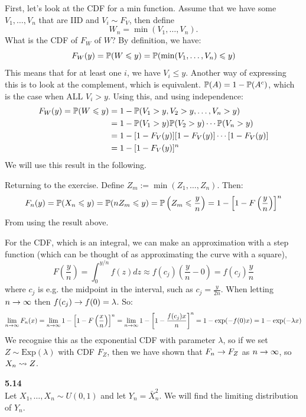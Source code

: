 \medskip\noindent First, let's look at the CDF for a min function. Assume that
we have some $V_1, \ldots, V_n$ that are IID and $V_i\sim F_V$, then define
$$
W_n = \min(V_1,\ldots, V_n).
$$
What is the CDF of $F_W$ of $W$? By definition, we have:
$$
F_W(y) = \P(W\leq y) = \P(\min(V_1,\ldots,V_n) \leq y)
$$
This means that for at least one $i$, we have $V_i\leq y$. Another way of expressing
this is to look at the complement, which is equivalent. $\P(A) = 1 - \P(A^c)$, which
is the case when ALL $V_i > y$. Using this, and using independence:
\begin{align*}
    F_W(y) = \P(W\leq y)
    &= 1 - \P(V_1 > y, V_2 > y, \ldots, V_n > y) \\
    &= 1 - \P(V_1 > y)\P(V_2 > y)\cdots\P(V_n > y) \\
    &= 1 - [1 - F_V(y)][1 - F_V(y)]\cdots[1 - F_V(y)] \\
    &= 1 - [1 - F_V(y)]^n
\end{align*}
We will use this result in the following.

\medskip\noindent Returning to the exercise. Define $Z_m := \min(Z_1,\ldots, Z_n)$. Then:
\begin{align*}
    F_n(y) = \P(X_n \leq y) = \P(nZ_m \leq y) = \P\left(Z_m \leq \frac{y}{n}\right) 
    = 1 - \left[1 - F\left(\frac{y}{n}\right)\right]^n %
\end{align*}
From using the result above.

For the CDF, which is an integral, we can make an approximation with a step function
(which can be thought of as approximating the curve with a square),
$$
F\left(\frac{y}{n}\right) = \int_0^{y/n} f(z)dz \approx f(c_j)\left(\frac{y}{n} - 0\right)
= f(c_j)\frac{y}{n}
$$
where $c_j$ is e.g. the midpoint in the interval, such as $c_j = \frac{y}{2n}$.
When letting $n\ra\infty$ then $f(c_j)\ra f(0) = \lambda$. So:
$$
\lim_{n\ra\infty} F_n(x) = \lim_{n\ra\infty} 1 - \left[1 - F\left(\frac{x}{n}\right)\right]^n
= \lim_{n\ra\infty} 1 - \left[1 - \frac{f(c_j)x}{n}\right]^n
= 1 - \exp(-f(0) x)
= 1 - \exp(-\lambda x)
$$
We recognise this as the exponential CDF with parameter $\lambda$, so if we set
$Z\sim\text{Exp}(\lambda)$ with CDF $F_Z$, then we have shown that
$F_n\ra F_Z$ as $n\ra\infty$, so $X_n\raD Z$.


\newpage\noindent
\textbf{5.14}\\  %
Let $X_1,\ldots,X_n\sim U(0,1)$ and let $Y_n = \bar{X}_n^2$. We will find the
limiting distribution of $Y_n$. 

